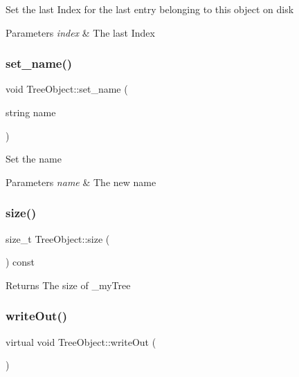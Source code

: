 Set the last Index for the last entry belonging to this object on disk 
\begin{DoxyParams}{Parameters}
{\em index} & The last Index \\
\hline
\end{DoxyParams}
\mbox{\label{classTreeObject_a8ae7e42502b4652102e0b3c4c4e1671b}} 
\subsubsection{\texorpdfstring{set\+\_\+name()}{set\_name()}}
{\footnotesize\ttfamily void Tree\+Object\+::set\+\_\+name (\begin{DoxyParamCaption}\item[{string}]{name }\end{DoxyParamCaption})}

Set the name 
\begin{DoxyParams}{Parameters}
{\em name} & The new name \\
\hline
\end{DoxyParams}
\mbox{\label{classTreeObject_a2a3dffe29aba8965c7977312c3721b50}} 
\subsubsection{\texorpdfstring{size()}{size()}}
{\footnotesize\ttfamily size\+\_\+t Tree\+Object\+::size (\begin{DoxyParamCaption}{ }\end{DoxyParamCaption}) const}

\begin{DoxyReturn}{Returns}
The size of \+\_\+my\+Tree 
\end{DoxyReturn}
\mbox{\label{classTreeObject_abf2bf88337bec961784b5dfeb9b795ed}} 
\subsubsection{\texorpdfstring{write\+Out()}{writeOut()}}
{\footnotesize\ttfamily virtual void Tree\+Object\+::write\+Out (\begin{DoxyParamCaption}{ }\end{DoxyParamCaption})\hspace{0.3cm}{\ttfamily [pure virtual]}}

